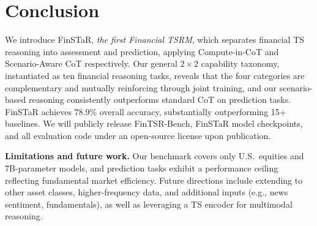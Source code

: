 \section{Conclusion}
We introduce FinSTaR, 
\textit{the first Financial TSRM},
which separates financial TS reasoning into assessment and prediction, applying Compute-in-CoT and Scenario-Aware CoT respectively.
Our general $2 \times 2$ capability taxonomy, instantiated as ten financial reasoning tasks, reveals that the four categories are complementary and mutually reinforcing through joint training, and our scenario-based reasoning consistently outperforms standard CoT on prediction tasks.
FinSTaR achieves 78.9\% overall accuracy, substantially outperforming 15+ baselines.
We will publicly release FinTSR-Bench, FinSTaR model checkpoints, and all evaluation code under an open-source license upon publication.

\textbf{Limitations and future work.}
Our benchmark covers only U.S.\ equities and 7B-parameter models, and prediction tasks exhibit a performance ceiling reflecting fundamental market efficiency.
Future directions include extending to other asset classes, higher-frequency data, and additional inputs (e.g., news sentiment, fundamentals), as well as leveraging a TS encoder for multimodal reasoning.
